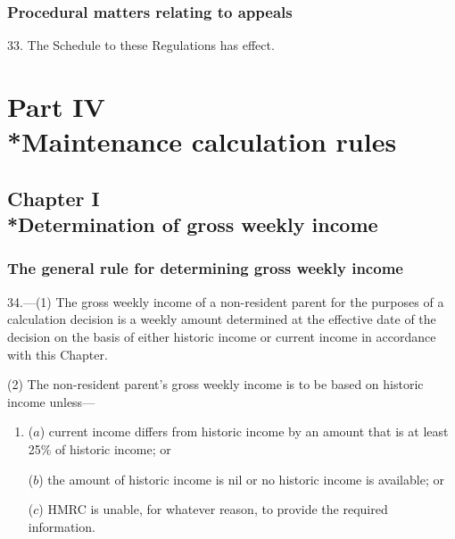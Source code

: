 \documentclass[12pt,a4paper]{article}
\begin{document}
\subsubsection[33. Procedural matters relating to appeals]{Procedural matters relating to appeals}

33.  The Schedule to these Regulations has effect.

\section[Part IV --- Maintenance calculation rules]{Part IV\\*Maintenance calculation rules}

\subsection[Chapter I --- Determination of gross weekly income]{Chapter I\\*Determination of gross weekly income}

\renewcommand\parthead{--- Part IV Chapter I}

\subsubsection[34. The general rule for determining gross weekly income]{The general rule for determining gross weekly income}

34.---(1)  The gross weekly income of a non-resident parent for the purposes of a calculation decision is a weekly amount determined at the effective date of the decision on the basis of either historic income or current income in accordance with this Chapter.

(2) The non-resident parent’s gross weekly income is to be based on historic income unless—
\begin{enumerate}\item[]
($a$) current income differs from historic income by an amount that is at least 25\% of historic income; or

($b$) 
the amount of historic income is nil or  %
no historic income is available;
or

($c$) HMRC is unable, for whatever reason, to provide the required information.
%
\end{enumerate}
\end{document}
